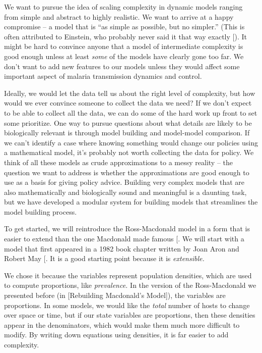 \documentclass[
]{book}
\begin{document}
We want to pursue the idea of scaling complexity in dynamic models ranging from simple and abstract to highly realistic. We want to arrive at a happy compromise -- a model that is ``as simple as possible, but no simpler.'' (This is often attributed to Einstein, who probably never said it that way exactly {[}\citeproc{ref-RobinsonA2018DidEinstein}{53}{]}). It might be hard to convince anyone that a model of intermediate complexity is good enough unless at least \emph{some} of the models have clearly gone too far. We don't want to add new features to our models unless they would affect some important aspect of malaria transmission dynamics and control.

Ideally, we would let the data tell us about the right level of complexity, but how would we ever convince someone to collect the data we need? If we don't expect to be able to collect all the data, we can do some of the hard work up front to set some prioritize.
One way to pursue questions about what details are likely to be biologically relevant is through model building and model-model comparison. If we can't identify a case where knowing something would change our policies using a mathematical model, it's probably not worth collecting the data for policy. We think of all these models as crude approximations to a messy reality -- the question we want to address is whether the approximations are good enough to use as a basis for giving policy advice. Building very complex models that are also mathematically and biologically sound and meaningful is a daunting task, but we have developed a modular system for building models that streamlines the model building process.

To get started, we will reintroduce the Ross-Macdonald model in a form that is easier to extend than the one Macdonald made famous {[}\citeproc{ref-SmithDL2012_RossMacdonald}{2}{]}. We will start with a model that first appeared in a 1982 book chapter written by Joan Aron and Robert May {[}\citeproc{ref-AronJL1982PopulationDynamics}{54}{]}. It is a good starting point because it is \emph{extensible.}

We chose it because the variables represent population densities, which are used to compute proportions, like \emph{prevalence.} In the version of the Ross-Macdonald we presented before (in {[}Rebuilding Macdonald's Model{]}), the variables are proportions. In some models, we would like the \emph{total} number of hosts to change over space or time, but if our state variables are proportions, then these densities appear in the denominators, which would make them much more difficult to modify. By writing down equations using densities, it is far easier to add complexity.
\end{document}
